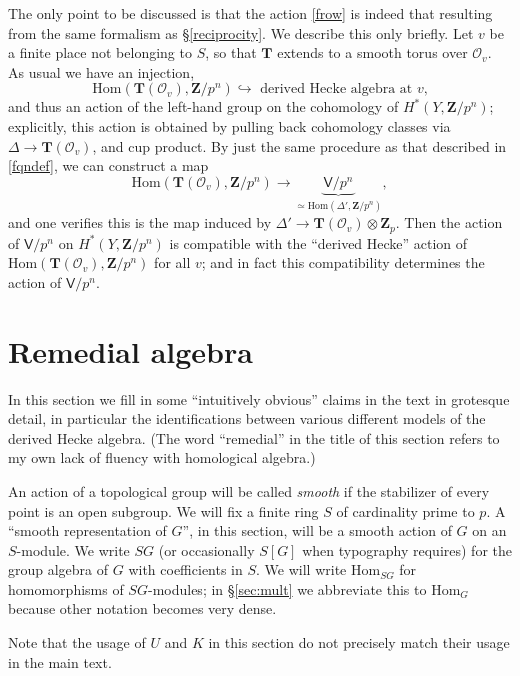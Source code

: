 \documentclass[10pt]{amsart}
\newcommand{\changecolor}{black}
\newcommand{\Z}{\mathbf{Z}}
\newcommand{\Hom}{\mathrm{Hom}}
\theoremstyle{remark}
\begin{document}
The only point to be discussed is that the action \eqref{frow} is indeed that 
resulting from the  same formalism as \S \ref{reciprocity}.  We describe this only briefly. 
%
%
Let $v$ be a finite place not belonging to $S$, so that $\mathbf{T}$ extends to a smooth torus over $\mathcal{O}_v$. 
As usual we have an injection, 
 $$  \Hom(\mathbf{T}(\mathcal{O}_v), \Z/p^n) \hookrightarrow \mbox{ derived Hecke algebra at $v$,}$$
 and thus an action of  the left-hand group on the cohomology
 of $H^*(Y,\Z/p^n)$; explicitly, this action is obtained by pulling back cohomology classes via $\Delta \rightarrow \mathbf{T}(\mathcal{O}_v)$, and cup product. 
 By just the same procedure as  that described  in \eqref{fqndef}, we can construct a map  
%
%
%
%
%
%
%
%
%
%
%
 $$ \Hom(\mathbf{T}(\mathcal{O}_v), \Z/p^n)  \rightarrow \underbrace{ \mathsf{V}/p^n}_{\simeq \Hom(\Delta',\Z/p^n)} ,$$
and one verifies this is the  map induced by $\Delta' \rightarrow \mathbf{T}(\mathcal{O}_v) \otimes \Z_p$. 
 Then the action of $\mathsf{V}/p^n$  on $H^*(Y, \Z/p^n)$ is compatible with the ``derived Hecke'' action of $\Hom(\mathbf{T}(\mathcal{O}_v), \Z/p^n) $ for all $v$;
 and in fact this compatibility determines the action of $\mathsf{V}/p^n$. 

  
  \appendix

\section{Remedial algebra} \label{remedial}


In this section we fill in 
some ``intuitively obvious'' claims in the text in grotesque detail, in particular
the identifications between  various different models of the derived Hecke algebra. 
(The  word ``remedial'' in the title of this section refers to my own lack of fluency with 
  homological algebra.)
 
 An action of a topological group will be called {\em smooth} if the stabilizer of every point is an open subgroup.      We will fix a 
   finite ring $S$ of cardinality prime to $p$.  A ``smooth representation of $G$'', in this section,
   will be a smooth action of $G$ on an $S$-module.  We write $SG$ (or occasionally $S[G]$ when typography requires) for the group algebra of $G$ with 
   coefficients in $S$. {\color{\changecolor} We will write $\Hom_{SG}$ for homomorphisms of $SG$-modules; in \S \ref{sec:mult} we abbreviate this to $\Hom_{G}$ because
   other notation becomes very dense.}  
      
   Note that the usage of $U$ and $K$ in this section do not precisely match their usage in the main text. 
   
\end{document}
